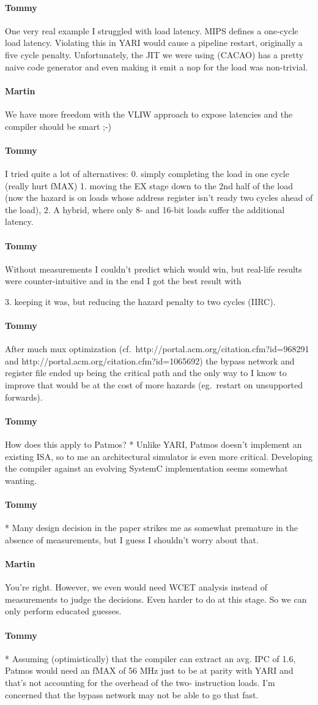 \documentclass{IEEEtran}
\newcommand{\comment}[3]{\paragraph*{\textbf{#1}}{\color{#3}#2}}
\newcommand{\tommy}[1]{\comment{Tommy}{#1}{Red}}
\newcommand{\martin}[1]{\comment{Martin}{#1}{Blue}}
\begin{document}
 \tommy{One very real example I struggled with load latency. MIPS
 defines a one-cycle load latency. Violating this in YARI would
 cause a pipeline restart, originally a five cycle penalty.
 Unfortunately, the JIT we were using (CACAO) has a pretty
 naive code generator and even making it emit a nop for the
 load was non-trivial.}

 \martin{We have more freedom with the VLIW approach to
 expose latencies and the compiler should be smart ;-)}

\tommy{I tried quite a lot of alternatives:
 0. simply completing the load in one cycle (really hurt fMAX)
 1. moving the EX stage down to the 2nd half of the load (now
    the hazard is on loads whose address register isn't ready
    two cycles ahead of the load),
 2. A hybrid, where only 8- and 16-bit loads suffer the additional
   latency.}

\tommy{ Without measurements I couldn't predict which would win, but
 real-life results were counter-intuitive and in the end I got the
 best result with

 3. keeping it was, but reducing the hazard penalty to two
  cycles (IIRC).}

\tommy{After much mux optimization
  (cf.~http://portal.acm.org/citation.cfm?id=968291 and
  http://portal.acm.org/citation.cfm?id=1065692)
 the bypass network and register file ended up being the critical
 path and the only way to I know to improve that would be at
 the cost of more hazards (eg.~restart on unsupported forwards).}


\tommy{How does this apply to Patmos?
* Unlike YARI, Patmos doesn't implement an existing ISA, so to
 me an architectural simulator is even more critical. Developing
 the compiler against an evolving SystemC implementation
 seems somewhat wanting.}

\tommy{* Many design decision in the paper strikes me as somewhat
 premature in the absence of measurements, but I guess I
 shouldn't worry about that.}

\martin{You're right. However, we even would need WCET analysis instead
of measurements to judge the decisions. Even harder to do at this
stage. So we can only perform educated guesses.}

\tommy{* Assuming (optimistically) that the compiler can extract an avg. IPC
 of 1.6, Patmos would need an fMAX of 56 MHz just to be at parity
 with YARI and that's not accounting for the overhead of the two-
 instruction loads. I'm concerned that the bypass network may not
 be able to go that fast.}
\end{document}
